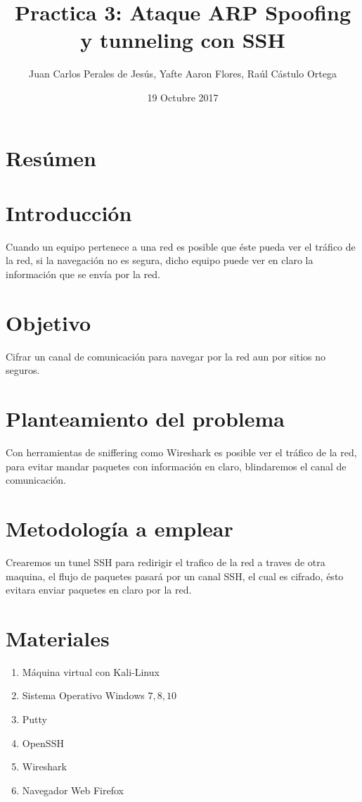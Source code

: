 \documentclass{article}
\title{Practica 3: Ataque ARP Spoofing y tunneling con SSH}
\author{Juan Carlos Perales de Jes\'us, Yafte Aaron Flores, Ra\'ul C\'astulo Ortega}
\date{19 Octubre 2017}
\begin{document}
\maketitle
\newpage

\section{Res\'umen}

\section{Introducci\'on}
Cuando un equipo pertenece a una red es posible que \'este pueda ver el tr\'afico de la red, si la navegaci\'on no es segura, dicho equipo puede ver en claro la informaci\'on que se envía por la red.
 
\section{Objetivo}
Cifrar un canal de comunicaci\'on para navegar por la red aun por sitios no seguros.

\section{Planteamiento del problema}
Con herramientas de sniffering como Wireshark es posible ver el tr\'afico de la red, para evitar mandar paquetes con informaci\'on en claro, blindaremos el canal de comunicaci\'on.

\section{Metodolog\'ia a emplear}
Crearemos un tunel SSH para redirigir el trafico de la red a traves de otra maquina, el flujo de paquetes pasar\'a por un canal SSH, el cual es cifrado, \'esto evitara enviar paquetes en claro por la red.

\section{Materiales}
\begin{enumerate}
\item M\'aquina virtual con Kali-Linux
\item Sistema Operativo Windows \(7,8,10\)
\item Putty
\item OpenSSH
\item Wireshark
\item Navegador Web Firefox
\end{enumerate}
\end{document}
